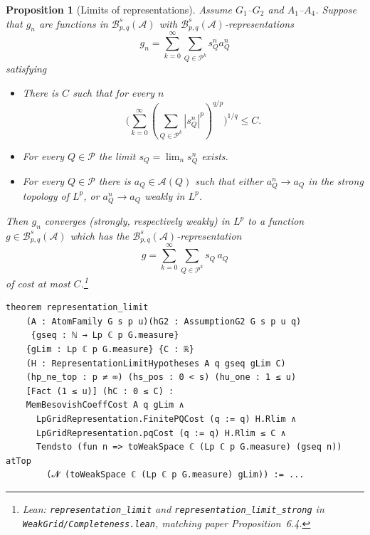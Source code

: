 \documentclass[11pt]{amsart}
\newtheorem{proposition}[theorem]{Proposition}
\theoremstyle{definition}
\newcommand{\SP}{{\mathcal P}}
\newcommand{\lean}[1]{\texttt{#1}}
\begin{document}
\begin{proposition}[Limits of representations]\label{compa2}
Assume $G_1$--$G_2$ and $A_1$--$A_4$. Suppose that $g_n$ are functions in
$\mathcal{B}^s_{p,q}(\mathcal{A})$ with
$\mathcal{B}^s_{p,q}(\mathcal{A})$-representations
$$g_n=\sum_{k=0}^{\infty}\sum_{Q\in \SP^k}s_Q^na_Q^n$$
satisfying
\begin{itemize}
\item[i.] There is $C$ such that for every $n$
$$\big(\sum_{k=0}^{\infty}(\sum_{Q\in \SP^k}|s_Q^n|^p)^{q/p}\big)^{1/q}\leq C.$$
\item[ii.] For every $Q\in \mathcal{P}$ the limit $s_Q=\lim_n s_Q^n$ exists.
\item[iii.] For every $Q\in \mathcal{P}$ there is $a_Q\in \mathcal{A}(Q)$ such
that either $a_Q^n \to a_Q$ in the strong topology of $L^p$, or $a_Q^n \to
a_Q$ weakly in $L^p$.
\end{itemize}
Then $g_n$ converges (strongly, respectively weakly) in $L^p$ to a function
$g \in \mathcal{B}^s_{p,q}(\mathcal{A})$ which has the
$\mathcal{B}^s_{p,q}(\mathcal{A})$-representation
$$g=\sum_{k=0}^{\infty}\sum_{Q\in \SP^k}s_Q\, a_Q$$
of cost at most $C$.\footnote{Lean: \lean{representation\_limit} and
\lean{representation\_limit\_strong} in \lean{WeakGrid/Completeness.lean},
matching paper Proposition~6.4.}
\end{proposition}
\begin{lstlisting}[style=lean]
theorem representation_limit
    (A : AtomFamily G s p u)(hG2 : AssumptionG2 G s p u q)
     {gseq : ℕ → Lp ℂ p G.measure}
    {gLim : Lp ℂ p G.measure} {C : ℝ}
    (H : RepresentationLimitHypotheses A q gseq gLim C)
    (hp_ne_top : p ≠ ∞) (hs_pos : 0 < s) (hu_one : 1 ≤ u)
    [Fact (1 ≤ u)] (hC : 0 ≤ C) :
    MemBesovishCoeffCost A q gLim ∧
      LpGridRepresentation.FinitePQCost (q := q) H.Rlim ∧
      LpGridRepresentation.pqCost (q := q) H.Rlim ≤ C ∧
      Tendsto (fun n => toWeakSpace ℂ (Lp ℂ p G.measure) (gseq n)) atTop
        (𝓝 (toWeakSpace ℂ (Lp ℂ p G.measure) gLim)) := ...
\end{lstlisting}
\end{document}
